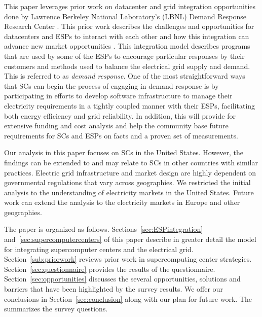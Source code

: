This paper %
leverages prior work on datacenter and grid integration opportunities
done by Lawrence Berkeley National Laboratory's (LBNL) Demand Response 
Research Center \cite{LBNL}. This prior work describes the challenges and opportunities for datacenters and %
ESPs to interact with each other and how this integration can advance 
new market opportunities \cite{Ghatikar2012a, Ghatikar2012b}. 
This integration model describes programs that are used by some of the ESPs %
to encourage particular responses by their customers and methods 
used to balance the electrical grid supply and demand. This is referred to as \emph{demand response}. %
One of the most straightforward ways that SCs can begin
the process of engaging %
in demand response is by participating in efforts to
develop software 
infrastructure to manage their electricity requirements in a tightly coupled manner 
with their ESPs, facilitating both energy efficiency and grid reliability. In addition, this will provide for extensive funding and cost analysis and help the community base future requirements for SCs and ESPs on facts and a proven set of measurements.

Our analysis in this paper focuses %
on SCs in the United States. However, 
the findings can be extended to and may relate to SCs in other countries with similar practices. 
Electric grid infrastructure and market design are highly dependent on %
governmental regulations that vary across geographies.  We restricted the initial analysis to the understanding of 
electricity markets in the United States. Future work can extend the analysis to the electricity markets in Europe and other geographies.

The paper is organized as follows.
Sections~\ref{sec:ESPintegration} and~\ref{sec:supercomputercenters} of this paper
describe in greater detail the model for 
integrating supercomputer centers and the electrical grid.
Section~\ref{sub:priorwork}
reviews prior work in supercomputing center strategies. %
Section~\ref{sec:questionnaire} provides the results of the questionnaire. 
Section~\ref{sec:opportunities} 
discusses the several opportunities, solutions and barriers that have been highlighted
by the survey results. We offer our conclusions in Section~\ref{sec:conclusion} along with our plan for future work.  
The  summarizes the survey questions.
